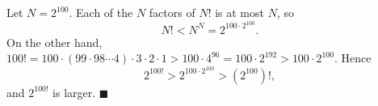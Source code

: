 Let $N=2^{100}$. Each of the $N$ factors of $N!$ is at most $N$, so
\[N!<N^N=2^{100\cdot2^{100}}.\]
On the other hand, $100!=100\cdot(99\cdot98\cdots4)\cdot3\cdot2\cdot1>100\cdot4^{96}=100\cdot2^{192}>100\cdot2^{100}$. Hence
\[2^{100!}>2^{100\cdot2^{100}}>\left(2^{100}\right)!,\]
and $\boxed{2^{100!}}$ is larger. $\blacksquare$
